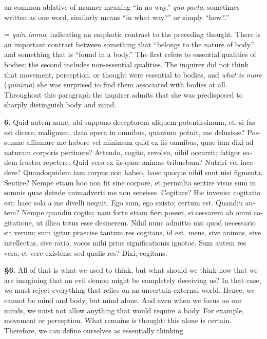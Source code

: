  an common ablative of manner meaning ``in no way.'' \textit{quo pacto}, sometimes written as one word, similarly means ``in what way?'' or simply ``how?.''

 = \textit{quin immo}, indicating an emphatic contrast to the preceding thought. There is an important contrast between something that ``belongs to the nature of body'' and something that is ``found in a body.'' The first refers to essential qualities of bodies; the second includes non-essential qualities. The inquirer did not think that movement, perception, or thought were essential to bodies, and \textit{what is more} (\textit{quinimo}) she was surprised to find them associated with bodies at all. Throughout this paragraph the inquirer admits that she was predisposed to sharply distinguish body and mind.

\clearpage

\beginnumbering
\pstart
\begin{latin}
    \textenglish{\textbf{6.}} Quid autem nunc, ubi suppono deceptorem aliquem potentissimum, et, si fas est dicere, malignum, data opera in omnibus, quantum potuit, me delusisse? Possumne affirmare me habere vel minimum quid ex iis omnibus, quae iam dixi ad naturam corporis pertinere? Attendo, cogito, revolvo, nihil occurrit; fatigor eadem frustra repetere. Quid vero ex iis quae animae tribuebam? Nutriri vel incedere? Quandoquidem iam corpus non habeo, haec quoque nihil sunt nisi figmenta. Sentire? Nempe etiam hoc non fit sine corpore, et permulta sentire visus sum in somnis quae deinde animadverti me non sensisse. Cogitare? Hic invenio: cogitatio est; haec sola a me divelli nequit. Ego sum, ego existo; certum est. Quandiu autem? Nempe quandiu cogito; nam forte etiam fieri posset, si cessarem ab omni cogitatione, ut illico totus esse desinerem. Nihil nunc admitto nisi quod necessario sit verum; sum igitur praecise tantum res cogitans, id est, mens, sive animus, sive intellectus, sive ratio, voces mihi prius significationis ignotae. Sum autem res vera, et vere existens; sed qualis res? Dixi, cogitans.
\end{latin}
\pend
\endnumbering

\prenotes

\textbf{§6.} All of that is what we used to think, but what should we think now that we are imagining that an evil demon might be completely deceiving us? In that case, we must reject everything that relies on an uncertain external world. Hence, we cannot be mind and body, but mind alone. And even when we focus on our minds, we must not allow anything that would require a body. For example, movement or perception. What remains is thought: this alone is certain. Therefore, we can define ourselves as essentially thinking.

